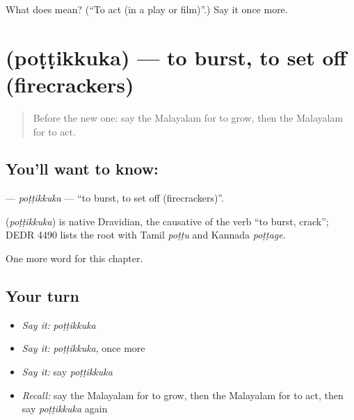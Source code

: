 \begin{tcolorbox}[breakable,colback=teal!4,colframe=teal!35!black,title={Before you move on}]
What does  mean? (\textquotedblleft{}To act (in a play or film)\textquotedblright{}.) Say it once more.
\end{tcolorbox}
\section[\texorpdfstring{\ml{പൊട്ടിക്കുക} (poṭṭikkuka)}{പൊട്ടിക്കുക (poṭṭikkuka)}]{ (poṭṭikkuka) — to burst, to set off (firecrackers)}

\label{lesson:ML-C307-pottikkuka}



\begin{quote}
Before the new one: say the Malayalam for to grow, then the Malayalam for to act.
\end{quote}

\subsection*{You'll want to know: }
\textbf{} — \emph{poṭṭikkuka} — \textquotedblleft{}to burst, to set off (firecrackers)\textquotedblright{}.

\begin{cousinweb}
\textbf{} (\emph{poṭṭikkuka}) is native Dravidian, the causative of the verb \textquotedblleft{}to burst, crack\textquotedblright{}; DEDR 4490 lists the root with Tamil \emph{poṭṭu} and Kannada \emph{poṭṭage}.
\end{cousinweb}

\begin{grammarlens}[title={What you've built}]
One more word for this chapter.
\end{grammarlens}

\subsection*{Your turn}
\begin{itemize}
\raggedright
  \item \emph{Say it:} \emph{poṭṭikkuka}
  \item \emph{Say it:} \emph{poṭṭikkuka}, once more
  \item \emph{Say it:} say \emph{poṭṭikkuka}
  \item \emph{Recall:} say the Malayalam for to grow, then the Malayalam for to act, then say \emph{poṭṭikkuka} again
\end{itemize}

